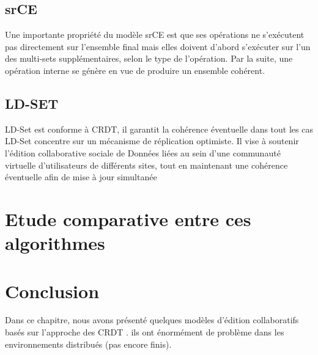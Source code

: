 \documentclass[12pt]{report}
\begin{document}
\subsection{srCE}
Une importante propriété du modèle srCE est que ses opérations ne s’exécutent pas 
directement sur l’ensemble final mais elles doivent d’abord s’exécuter sur l’un des multi-sets 
supplémentaires, selon le type de l’opération. Par la suite, une opération interne se génère en vue 
de produire un ensemble cohérent.
\subsection{LD-SET}
LD-Set est conforme à CRDT, il garantit la cohérence éventuelle dans tout les cas LD-Set concentre sur un mécanisme de réplication optimiste. Il vise à
soutenir l’édition collaborative sociale de Données liées au sein d’une communauté virtuelle d’utilisateurs de différents sites, tout en maintenant une cohérence éventuelle afin de mise à jour simultanée
\section{Etude comparative entre ces algorithmes}
\section*{Conclusion}
Dans ce chapitre, nous avons présenté quelques modèles d’édition collaboratifs basés sur l’approche des
CRDT . ils ont énormément de problème dans les environnements distribués (pas encore finis).
 

 

\end{document}
